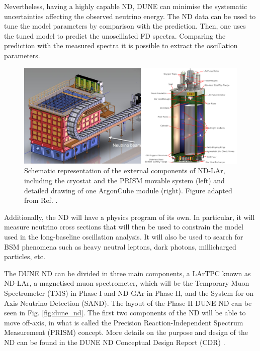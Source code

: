 Nevertheless, having a highly capable ND, DUNE can minimise the systematic uncertainties affecting the observed neutrino energy. The ND data can be used to tune the model parameters by comparison with the prediction. Then, one uses the tuned model to predict the unoscillated FD spectra. Comparing the prediction with the measured spectra it is possible to extract the oscillation parameters.

\begin{figure}[t]
	\centering
	\includegraphics[width=0.99\linewidth]{Images/DUNE/ND/nd_lar_mod}
	\caption[Schematic representation of the external components of ND-LAr, including the cryostat and the PRISM movable system and detailed drawing of one ArgonCube module.]{Schematic representation of the external components of ND-LAr, including the cryostat and the PRISM movable system (left) and detailed drawing of one ArgonCube module (right). Figure adapted from Ref. \cite{DUNE2020TDR1}.}
	\label{fig:dune_nd_lar}
\end{figure}

Additionally, the ND will have a physics program of its own. In particular, it will measure neutrino cross sections that will then be used to constrain the model used in the long-baseline oscillation analysis. It will also be used to search for BSM phenomena such as heavy neutral leptons, dark photons, millicharged particles, etc.

The DUNE ND can be divided in three main components, a LArTPC known as ND-LAr, a magnetised muon spectrometer, which will be the Temporary Muon Spectrometer (TMS) in Phase I and ND-GAr in Phase II, and the System for on-Axis Neutrino Detection (SAND). The layout of the Phase II DUNE ND can be seen in Fig. \ref{fig:dune_nd}. The first two components of the ND will be able to move off-axis, in what is called the Precision Reaction-Independent Spectrum Measurement (PRISM) concept. More details on the purpose and design of the ND can be found in the DUNE ND Conceptual Design Report (CDR) \cite{DUNE2021NDCDR}.


